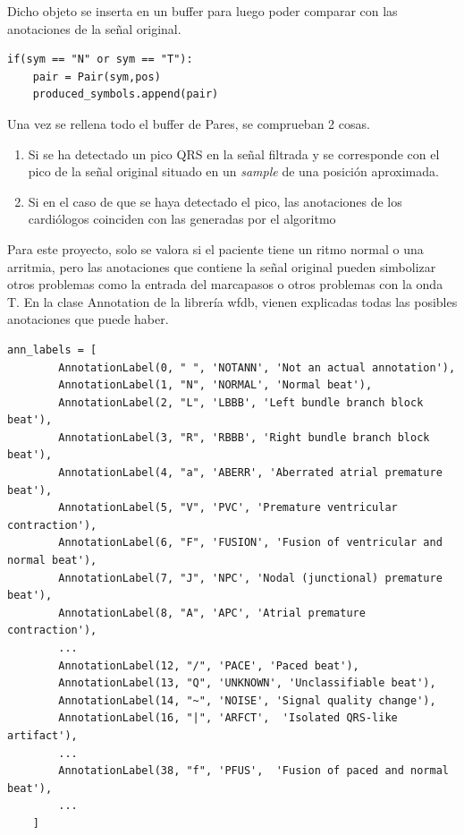 Dicho objeto se inserta en un buffer para luego poder comparar con las anotaciones de la señal original.

\lstset{language=python, breaklines=true, basicstyle=\footnotesize}
\begin{lstlisting}[frame=single]
if(sym == "N" or sym == "T"):
    pair = Pair(sym,pos)    
    produced_symbols.append(pair)
\end{lstlisting}

Una vez se rellena todo el buffer de Pares, se comprueban 2 cosas.
\begin{enumerate}
	\item Si se ha detectado un pico QRS en la señal filtrada y se
     corresponde con el pico de la señal original situado en un \textit{sample} de una posición aproximada.
	\item Si en el caso de que se haya detectado el pico, las anotaciones de los cardiólogos coinciden
     con las generadas por el algoritmo
\end{enumerate} 

Para este proyecto, solo se valora si el paciente tiene un ritmo normal o una arritmia, pero las anotaciones
que contiene la señal original pueden simbolizar otros problemas como la entrada del marcapasos o otros problemas con la onda T.
En la clase Annotation de la librería wfdb, vienen explicadas todas las posibles anotaciones que puede haber.
\lstset{language=python, breaklines=true, basicstyle=\footnotesize}
\begin{lstlisting}[frame=single]
    ann_labels = [
        AnnotationLabel(0, " ", 'NOTANN', 'Not an actual annotation'),
        AnnotationLabel(1, "N", 'NORMAL', 'Normal beat'),
        AnnotationLabel(2, "L", 'LBBB', 'Left bundle branch block beat'),
        AnnotationLabel(3, "R", 'RBBB', 'Right bundle branch block beat'),
        AnnotationLabel(4, "a", 'ABERR', 'Aberrated atrial premature beat'),
        AnnotationLabel(5, "V", 'PVC', 'Premature ventricular contraction'),
        AnnotationLabel(6, "F", 'FUSION', 'Fusion of ventricular and normal beat'),
        AnnotationLabel(7, "J", 'NPC', 'Nodal (junctional) premature beat'),
        AnnotationLabel(8, "A", 'APC', 'Atrial premature contraction'),
        ...
        AnnotationLabel(12, "/", 'PACE', 'Paced beat'),
        AnnotationLabel(13, "Q", 'UNKNOWN', 'Unclassifiable beat'),
        AnnotationLabel(14, "~", 'NOISE', 'Signal quality change'),
        AnnotationLabel(16, "|", 'ARFCT',  'Isolated QRS-like artifact'),
        ...
        AnnotationLabel(38, "f", 'PFUS',  'Fusion of paced and normal beat'),
        ...
    ]
\end{lstlisting}


